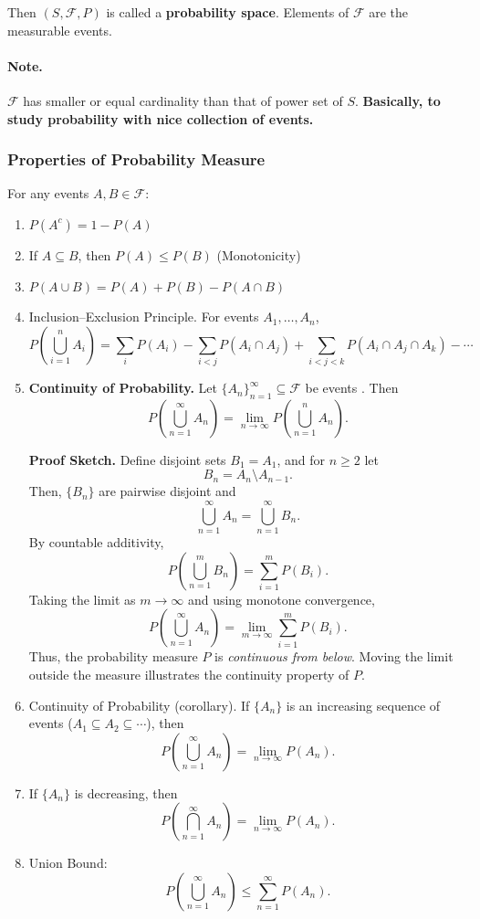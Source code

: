 Then $(S, \mathcal{F}, P)$ is called a \textbf{probability space}.  
Elements of $\mathcal{F}$ are the measurable events.

\paragraph{Note.} $\mathcal{F}$ has smaller or equal cardinality than that of power set of $S$. \textbf{Basically, to study probability with nice collection of events.}

\subsubsection{Properties of Probability Measure}

For any events $A, B \in \mathcal{F}$:
\begin{enumerate}
    \item $P(A^c) = 1 - P(A)$
    \item If $A \subseteq B$, then $P(A) \leq P(B)$ (Monotonicity)
    \item $P(A \cup B) = P(A) + P(B) - P(A \cap B)$
    \item Inclusion–Exclusion Principle. For events $A_1, \ldots, A_n$,
\[
P\left(\bigcup_{i=1}^n A_i\right)
= \sum_i P(A_i)
- \sum_{i<j} P(A_i \cap A_j)
+ \sum_{i<j<k} P(A_i \cap A_j \cap A_k) - \cdots
\]
   \item \textbf{Continuity of Probability.} 
    Let $\{A_n\}_{n=1}^\infty \subseteq \mathcal{F}$ be events . Then
    \[
    P\!\left(\bigcup_{n=1}^{\infty} A_n\right) = \lim_{n \to \infty} P(\bigcup_{n=1}^{n} A_n).
    \]
    
    \textbf{Proof Sketch.} 
    Define disjoint sets $B_1 = A_1$, and for $n \ge 2$ let 
    \[
    B_n = A_n \setminus A_{n-1}.
    \]
    Then, $\{B_n\}$ are pairwise disjoint and 
    \[
    \bigcup_{n=1}^{\infty} A_n = \bigcup_{n=1}^{\infty} B_n.
    \]
    By countable additivity,
    \[
    P\!\left(\bigcup_{n=1}^{m} B_n\right) = \sum_{i=1}^{m} P(B_i).
    \]
    Taking the limit as $m \to \infty$ and using monotone convergence,
    \[
    P\!\left(\bigcup_{n=1}^{\infty} A_n\right) 
    = \lim_{m \to \infty} \sum_{i=1}^{m} P(B_i).
    \]
    Thus, the probability measure $P$ is \emph{continuous from below}. 
    Moving the limit outside the measure illustrates the continuity property of $P$.

    
    \item Continuity of Probability (corollary). If $\{A_n\}$ is an increasing sequence of events ($A_1 \subseteq A_2 \subseteq \cdots$), then
\[
P\left(\bigcup_{n=1}^\infty A_n\right) = \lim_{n \to \infty} P(A_n).
\]

    \item If $\{A_n\}$ is decreasing, then
\[
P\left(\bigcap_{n=1}^\infty A_n\right) = \lim_{n \to \infty} P(A_n).
\]
    \item Union Bound: 
   \[
P\!\left(\bigcup_{n=1}^{\infty} A_n\right)
\leq
\sum_{n=1}^{\infty} P(A_n).
\]

\end{enumerate}

